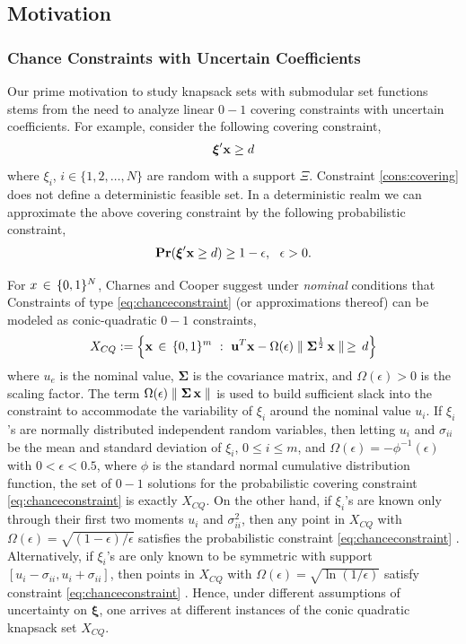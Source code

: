 \documentclass[10pt,twoside]{amsart}
\begin{document}
\subsection{Motivation}
\subsubsection{Chance Constraints with Uncertain Coefficients}\hfill

Our prime motivation to study knapsack sets with submodular set functions stems from the need to analyze linear $0-1$ covering constraints with uncertain coefficients. For example, consider the following covering constraint,
\begin{align}
\label{cons:covering}
    \boldsymbol{\xi}'\mathbf{x} \geq d
\end{align}
where $\xi_i$, $i \in \{1,2,\ldots, N\}$ are random with a support $\Xi$. Constraint \eqref{cons:covering} does not define a deterministic feasible set. In a deterministic realm we can approximate the above covering constraint by the following probabilistic constraint,
\begin{align}
\label{eq:chanceconstraint}
    \text{\bf{Pr}}(\boldsymbol{\xi}'\mathbf{x} \geq d) \geq 1 - \epsilon,\,\,\,\,\epsilon > 0.
\end{align}

For $x\,\in\, \{0,1\}^N$, Charnes and Cooper \cite{Charnes1963} suggest under \textit{nominal} conditions that Constraints of type \eqref{eq:chanceconstraint} (or approximations thereof) can be modeled as conic-quadratic $0-1$ constraints,
\begin{align}
\label{eq:equivalence}
  X_{CQ} := \left\{ {\mathbf{x}\,\in\, \{0, 1\}^m} \ : \ {\mathbf{u}^T\mathbf{x} - \Omega(\epsilon)\parallel\mathbf{\Sigma}^{\frac{1}{2}}\,\mathbf{x}\parallel\, \geq\, d} \right\}
\end{align}
where $u_e$ is the nominal value, $\boldsymbol\Sigma$ is the covariance matrix, and $\Omega(\epsilon) > 0$ is the scaling factor. The term $\Omega(\epsilon)\parallel\mathbf{\Sigma}\,\mathbf{x}\parallel$ is used to build sufficient slack into the constraint to accommodate the variability of $\xi_i$ around the nominal value $u_i$. If $\xi_i$'s are normally distributed independent random variables, then letting $u_i$ and $\sigma_{ii}$ be the mean and standard deviation of $\xi_i$, $0 \leq i \leq m$, and $\Omega(\epsilon) = -\phi^{-1}(\epsilon)$ with $0 < \epsilon < 0.5$, where $\phi$ is the standard normal cumulative distribution function, the set of $0-1$ solutions for the probabilistic covering constraint \eqref{eq:chanceconstraint} is exactly $X_{CQ}$. On the other hand, if $\xi_i$'s are known only through their first two moments $u_i$ and $\sigma^2_{ii}$, then any point in $X_{CQ}$ with $\Omega(\epsilon) = \sqrt{(1-\epsilon)/\epsilon}$ satisfies the probabilistic constraint \eqref{eq:chanceconstraint} \cite{Bertsimas2005,Ghaoui2003}. Alternatively, if $\xi_i$'s are only known to be symmetric with support $[u_i - \sigma_{ii}, u_i + \sigma_{ii}]$, then points in $X_{CQ}$ with $\Omega(\epsilon) = \sqrt{\ln(1/\epsilon)}$ satisfy constraint \eqref{eq:chanceconstraint} \cite{Ben-Tal2000,Ben-Tal2002}. Hence, under different assumptions of uncertainty on $\boldsymbol{\xi}$, one arrives at different instances of the conic quadratic knapsack set $X_{CQ}$.\\
\end{document}
